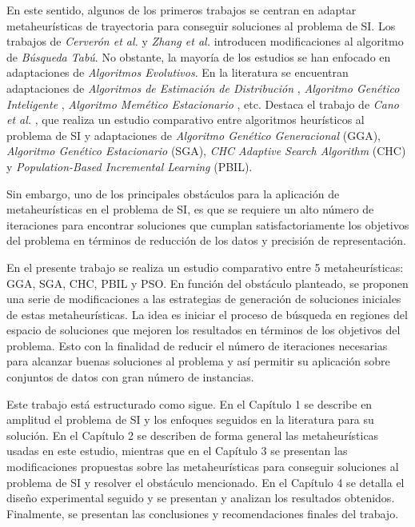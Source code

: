 En este sentido, algunos de los primeros trabajos se centran en adaptar metaheurísticas de trayectoria para conseguir soluciones al problema de SI. Los trabajos de \emph{Cerverón et al.} \cite{cerveron2001another} y \emph{Zhang et al.} \cite{zhang2002optimal} introducen modificaciones al algoritmo de \emph{Búsqueda Tabú}. No obstante, la mayoría de los estudios se han enfocado en adaptaciones de \emph{Algoritmos Evolutivos}. En la literatura se encuentran adaptaciones de \emph{Algoritmos de Estimación de Distribución} \cite{sierra2001prototype}, \emph{Algoritmo Genético Inteligente} \cite{ho2002design}, \emph{Algoritmo Memético Estacionario} \cite{garcia2008memetic}, etc. Destaca el trabajo de \emph{Cano et al.} \cite{cano2003using}, que realiza un estudio comparativo entre algoritmos heurísticos al problema de SI y adaptaciones de \emph{Algoritmo Genético Generacional} (GGA), \emph{Algoritmo Genético Estacionario} (SGA), \emph{CHC Adaptive Search Algorithm} (CHC) y \emph{Population-Based Incremental Learning} (PBIL).

Sin embargo, uno de los principales obstáculos para la aplicación de metaheurísticas en el problema de SI, es que se requiere un alto número de iteraciones para encontrar soluciones que cumplan satisfactoriamente los objetivos del problema en términos de reducción de los datos y precisión de representación.

En el presente trabajo se realiza un estudio comparativo entre 5 metaheurísticas: GGA, SGA, CHC, PBIL y PSO. En función del obstáculo planteado, se proponen una serie de modificaciones a las estrategias de generación de soluciones iniciales de estas metaheurísticas. La idea es iniciar el proceso de búsqueda en regiones del espacio de soluciones que mejoren los resultados en términos de los objetivos del problema. Esto con la finalidad de reducir el número de iteraciones necesarias para alcanzar buenas soluciones al problema y así permitir su aplicación sobre conjuntos de datos con gran número de instancias.

Este trabajo está estructurado como sigue. En el Capítulo 1 se describe en amplitud el problema de SI y los enfoques seguidos en la literatura para su solución. En el Capítulo 2 se describen de forma general las metaheurísticas usadas en este estudio, mientras que en el Capítulo 3 se presentan las modificaciones propuestas sobre las metaheurísticas para conseguir soluciones al problema de SI y resolver el obstáculo mencionado. En el Capítulo 4 se detalla el diseño experimental seguido y se presentan y analizan los resultados obtenidos. Finalmente, se presentan las conclusiones y recomendaciones finales del trabajo.
